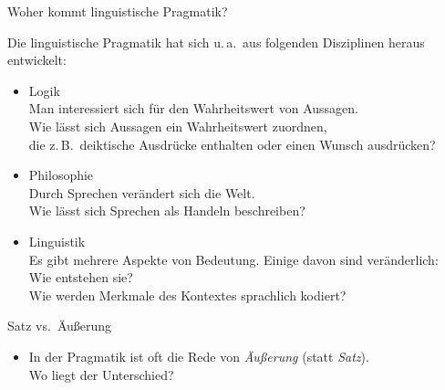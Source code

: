 \begin{frame}{Woher kommt linguistische Pragmatik?}
  
Die linguistische Pragmatik hat sich u.\,a.\ aus folgenden Disziplinen heraus entwickelt:

\begin{itemize}
\item \alert{Logik}\\
  Man interessiert sich für den Wahrheitswert von Aussagen.\\
  Wie lässt sich Aussagen ein Wahrheitswert zuordnen,\\
  die z.\,B.\ deiktische Ausdrücke enthalten oder einen Wunsch ausdrücken?
\item<2-> \alert{Philosophie}\\
  Durch Sprechen verändert sich die Welt.\\
  Wie lässt sich Sprechen als Handeln beschreiben?
\item<3-> \alert{Linguistik}\\
  Es gibt mehrere Aspekte von Bedeutung. Einige davon sind veränderlich:\\
  Wie entstehen sie?\\
 Wie werden Merkmale des Kontextes sprachlich kodiert?
\end{itemize}

\end{frame}




\begin{frame}{Satz vs.\ Äußerung}

  \begin{itemize}
  \item In der Pragmatik ist oft die Rede von \textit{Äußerung} (statt \textit{Satz}).\\
  Wo liegt der Unterschied?
  \end{itemize}

\pause
{}
\end{frame}




